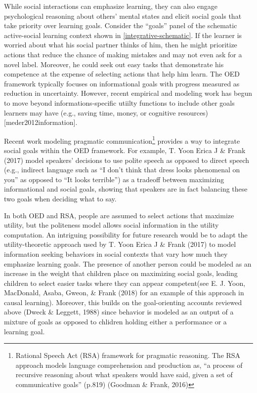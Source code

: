 \documentclass[oneside]{report}
\begin{document}
While social interactions can emphasize learning, they can also engage
psychological reasoning about others' mental states and elicit social
goals that take priority over learning goals. Consider the ``goals''
panel of the schematic active-social learning context shown in
\ref{integrative-schematic}. If the learner is worried about what his
social partner thinks of him, then he might prioritize actions that
reduce the chance of making mistakes and may not even ask for a novel
label. Moreover, he could seek out easy tasks that demonstrate his
competence at the expense of selecting actions that help him learn. The
OED framework typically focuses on informational goals with progress
measured as reduction in uncertainty. However, recent empirical and
modeling work has begun to move beyond informations-specific utiilty
functions to include other goals learners may have (e.g., saving time,
money, or cognitive resources) {[}meder2012information{]}.

Recent work modeling pragmatic communication\footnote{Rational Speech
  Act (RSA) framework for pragmatic reasoning. The RSA approach models
  language comprehension and production as, ``a process of recursive
  reasoning about what speakers would have said, given a set of
  communicative goals'' (p.819) (Goodman \& Frank, 2016)} provides a way
to integrate social goals within the OED framework. For example, T. Yoon
Erica J \& Frank (2017) model speakers' decisions to use polite speech
as opposed to direct speech (e.g., indirect language such as ``I don't
think that dress looks phenomenal on you'' as opposed to ``It looks
terrible'') as a tradeoff between maximizing informational and social
goals, showing that speakers are in fact balancing these two goals when
deciding what to say.

In both OED and RSA, people are assumed to select actions that maximize
utility, but the politeness model allows social information in the
utility computation. An intriguing possibility for future research would
be to adapt the utility-theoretic approach used by T. Yoon Erica J \&
Frank (2017) to model information seeking behaviors in social contexts
that vary how much they emphasize learning goals. The presence of
another person could be modeled as an increase in the weight that
children place on maximizing social goals, leading children to select
easier tasks where they can appear competent(see E. J. Yoon, MacDonald,
Asaba, Gweon, \& Frank (2018) for an example of this approach in causal
learning). Moreover, this builds on the goal-orienting accounts reviewed
above (Dweck \& Leggett, 1988) since behavior is modeled as an output of
a mixture of goals as opposed to chlidren holding either a performance
or a learning goal.
\end{document}
